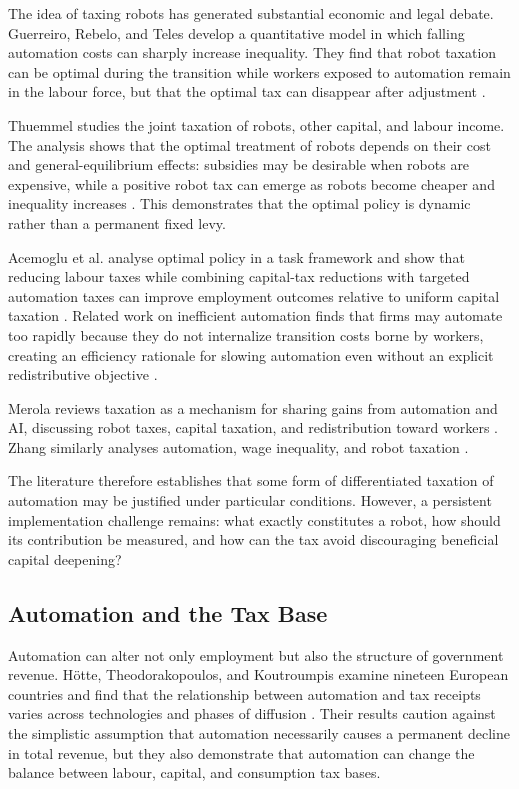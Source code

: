 \documentclass[conference]{IEEEtran}
\begin{document}
The idea of taxing robots has generated substantial economic and legal debate.
Guerreiro, Rebelo, and Teles develop a quantitative model in which falling
automation costs can sharply increase inequality. They find that robot taxation
can be optimal during the transition while workers exposed to automation remain
in the labour force, but that the optimal tax can disappear after adjustment
\cite{Guerreiro2022}.

Thuemmel studies the joint taxation of robots, other capital, and labour
income. The analysis shows that the optimal treatment of robots depends on
their cost and general-equilibrium effects: subsidies may be desirable when
robots are expensive, while a positive robot tax can emerge as robots become
cheaper and inequality increases \cite{Thuemmel2023}. This demonstrates that
the optimal policy is dynamic rather than a permanent fixed levy.

Acemoglu et al. analyse optimal policy in a task framework and show that reducing
labour taxes while combining capital-tax reductions with targeted automation
taxes can improve employment outcomes relative to uniform capital taxation
\cite{AcemogluOptimalPolicy}. Related work on inefficient automation finds that
firms may automate too rapidly because they do not internalize transition costs
borne by workers, creating an efficiency rationale for slowing automation even
without an explicit redistributive objective \cite{InefficientAutomation}.

Merola reviews taxation as a mechanism for sharing gains from automation and AI,
discussing robot taxes, capital taxation, and redistribution toward workers
\cite{Merola2022}. Zhang similarly analyses automation, wage inequality, and
robot taxation \cite{Zhang2019}.

The literature therefore establishes that some form of differentiated taxation
of automation may be justified under particular conditions. However, a persistent
implementation challenge remains: what exactly constitutes a robot, how should
its contribution be measured, and how can the tax avoid discouraging beneficial
capital deepening?

\subsection{Automation and the Tax Base}

Automation can alter not only employment but also the structure of government
revenue. H{\"o}tte, Theodorakopoulos, and Koutroumpis examine nineteen European
countries and find that the relationship between automation and tax receipts
varies across technologies and phases of diffusion \cite{Hotte2024}. Their
results caution against the simplistic assumption that automation necessarily
causes a permanent decline in total revenue, but they also demonstrate that
automation can change the balance between labour, capital, and consumption tax
bases.
\end{document}
